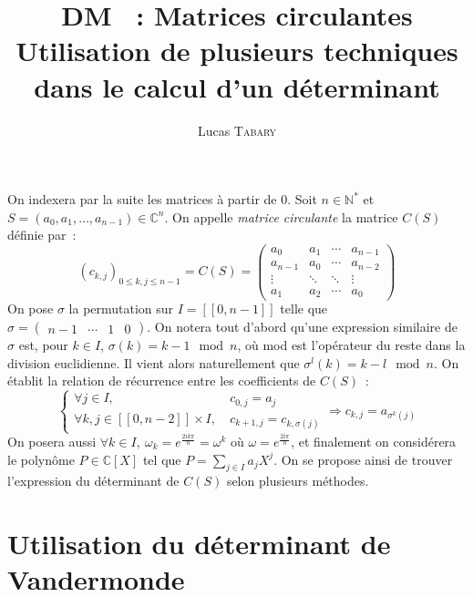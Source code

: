 \documentclass{article}
\title{DM \No 18~: Matrices circulantes \\ \normalsize Utilisation de plusieurs techniques dans le calcul d'un déterminant}
\author{Lucas \textsc{Tabary}}
\date{}
\begin{document}
  \maketitle{}

  \paragraph{} On indexera par la suite les matrices à partir de 0. Soit $n\in\mathbb{N}^*$ et $S = (a_0, a_1,\dots, a_{n-1}) \in \mathbb{C}^n$. On appelle \textit{matrice circulante} la matrice $C(S)$ définie par~:
  \[
    (c_{k,j})_{0 \le k, j \le n - 1} = C(S) =
    \begin{pmatrix}
      a_0 & a_1 & \cdots & a_{n-1} \\
      a_{n-1} & a_0 & \cdots & a_{n-2} \\
      \vdots  & \ddots  & \ddots & \vdots  \\
      a_1 & a_2 & \cdots & a_0
    \end{pmatrix}
  \]
  On pose $\sigma$ la permutation sur $I = [\![0, n-1]\!]$ telle que $\sigma = \begin{pmatrix} n - 1 & \cdots & 1 & 0 \end{pmatrix}$. On notera tout d'abord qu'une expression similaire de $\sigma$ est, pour $k\in I$, $\sigma(k) = k - 1 \mod n$, où mod est l'opérateur du reste dans la division euclidienne. Il vient alors naturellement que $\sigma^l(k) = k - l \mod n$. On établit la relation de récurrence entre les coefficients de $C(S)$~:
  \[
    \left\{
      \begin{aligned}
        \forall j \in I,&\: c_{0, j} = a_j \\
        \forall k, j \in [\![0, n-2]\!] \times I,&\: c_{k+1, j} = c_{k, \sigma(j)}
      \end{aligned}
    \right.
    \Longrightarrow c_{k, j} = a_{\sigma^k(j)}
  \]
  On posera aussi $\forall k\in I,\: \omega_k = e^{\frac{2ik\pi}{n}} = \omega^k$ où $\omega = e^{\frac{2i\pi}{n}}$, et finalement on considérera le polynôme $P\in\mathbb{C}[X]$ tel que $P = \sum_{j\in I} a_j X^j$. On se propose ainsi de trouver l'expression du déterminant de $C(S)$ selon plusieurs méthodes.

  \section*{Utilisation du déterminant de Vandermonde}
\end{document}
